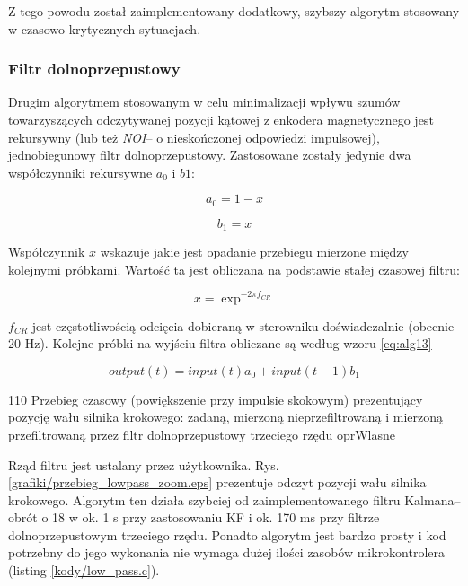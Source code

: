 Z tego powodu został zaimplementowany dodatkowy, szybszy algorytm stosowany w czasowo krytycznych sytuacjach.

\clearpage

\subsubsection{Filtr dolnoprzepustowy}

Drugim algorytmem stosowanym w celu minimalizacji wpływu szumów towarzyszących odczytywanej pozycji kątowej z enkodera magnetycznego jest rekursywny (lub też {\it NOI}-- o nieskończonej odpowiedzi impulsowej), jednobiegunowy filtr dolnoprzepustowy. Zastosowane zostały jedynie dwa współczynniki rekursywne $ a_0 $ \linebreak i $ b1 $:

\begin{equation} \label{eq:alg10}
	a_0 = 1 - x
\end{equation}

\begin{equation} \label{eq:alg11}
	b_1 = x
\end{equation}

Współczynnik $ x $ wskazuje jakie jest opadanie przebiegu mierzone między kolejnymi próbkami. Wartość ta jest obliczana na podstawie stałej czasowej filtru:

\begin{equation} \label{eq:alg12}
	x = \exp^{-2 \pi f_{CR}}
\end{equation}

$ f_{CR} $ jest częstotliwością odcięcia dobieraną w sterowniku doświadczalnie (obecnie 20 Hz). Kolejne próbki na wyjściu filtra obliczane są według wzoru \ref{eq:alg13}

\begin{equation} \label{eq:alg13}
	output(t) = input(t) a_0 + input(t - 1) b_1 
\end{equation}

	{110}
	{Przebieg czasowy (powiększenie przy impulsie skokowym) prezentujący pozycję wału silnika krokowego: zadaną,   mierzoną nieprzefiltrowaną i mierzoną przefiltrowaną przez filtr dolnoprzepustowy trzeciego rzędu}
	{oprWlasne}
	
Rząd filtru jest ustalany przez użytkownika. Rys. \ref{grafiki/przebieg_lowpass_zoom.eps} prezentuje odczyt pozycji wału silnika krokowego. Algorytm ten działa szybciej od zaimplementowanego filtru Kalmana-- obrót o 18\degree{} w ok. 1 s przy zastosowaniu KF i ok. 170 ms przy filtrze dolnoprzepustowym trzeciego rzędu. Ponadto algorytm jest bardzo prosty i kod potrzebny do jego wykonania nie wymaga dużej ilości zasobów mikrokontrolera (listing \ref{kody/low_pass.c}).


